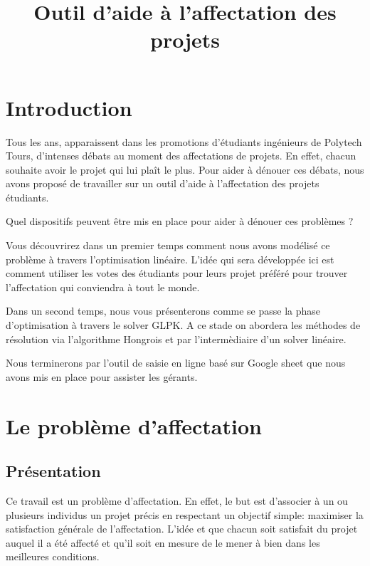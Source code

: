 \documentclass[final,poster]{polytech/polytech}
\title{Outil d'aide à l'affectation des projets}
\begin{document}

\chapter*{Introduction\label{chap:intro}}


Tous les ans, 	apparaissent dans les promotions d'étudiants ingénieurs de Polytech Tours, d'intenses débats au moment des affectations de projets. 
En effet, chacun souhaite avoir le projet qui lui plaît le plus. Pour aider à dénouer ces débats, nous avons proposé de travailler sur un outil d'aide à l'affectation des projets étudiants. 

Quel dispositifs peuvent être mis en place pour aider à dénouer ces problèmes ?



Vous découvrirez dans un premier temps comment nous avons modélisé ce problème à travers l'optimisation linéaire. L'idée qui sera développée ici est comment utiliser les votes des étudiants pour leurs projet préféré pour trouver l'affectation qui conviendra à tout le monde.

Dans un second temps, nous vous présenterons comme se passe la phase d'optimisation à travers le solver GLPK. A ce stade on abordera les méthodes de résolution via l'algorithme Hongrois et par l'intermèdiaire d'un solver linéaire.

Nous terminerons par l'outil de saisie en ligne basé sur Google sheet que nous avons mis en place pour assister les gérants.

\chapter{Le problème d'affectation\label{chap:pb_affectation}}


\section{Présentation\label{sec:pres_affectation}}


Ce travail est un problème d'affectation.
En effet, le but est d'associer à un ou plusieurs individus un projet précis en respectant un objectif simple: maximiser la satisfaction générale de l'affectation.
L'idée et que chacun soit satisfait du projet auquel il a été affecté et qu'il soit en mesure de le mener à bien dans les meilleures conditions.
\end{document}
